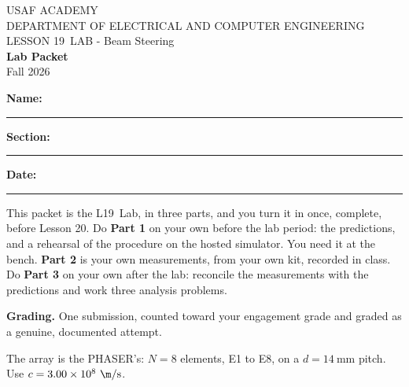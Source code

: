 \documentclass{exam}
\def\labLesson{19}
\def\thisterm{\thisTermIn}
\def\thisterm{Fall 2026}
\begin{document}
\pagestyle{headandfoot}   %



\begin{center}
USAF ACADEMY \\
DEPARTMENT OF ELECTRICAL AND COMPUTER ENGINEERING \\
LESSON \labLesson\ LAB - Beam Steering \\
\textbf{Lab Packet} \\
\thisterm \\[4mm]
\end{center}

\vspace{-4pt}
\textbf{Name:} \rule[-2pt]{2.6in}{0.4pt} \hfill
\textbf{Section:} \rule[-2pt]{0.9in}{0.4pt} \hfill
\textbf{Date:} \rule[-2pt]{1.1in}{0.4pt}

\vspace{4pt}


\vspace{2pt}

This packet is the L\labLesson\ Lab, in three parts, and you turn it in once, complete,
before Lesson 20. Do \textbf{Part 1} on your own before the lab period: the
predictions, and a rehearsal of the procedure on the hosted simulator. You need
it at the bench. \textbf{Part 2} is your own measurements, from your own kit,
recorded in class. Do
\textbf{Part 3} on your own after the lab: reconcile the measurements with the
predictions and work three analysis problems.

\textbf{Grading.} One submission, counted toward your engagement grade and
graded as a genuine, documented attempt.

The array is the PHASER's: $N = 8$ elements, E1 to E8, on a $d = 14\ \text{mm}$
pitch. Use $c = 3.00\times 10^{8}\ \m/\text{s}$.
\end{document}
